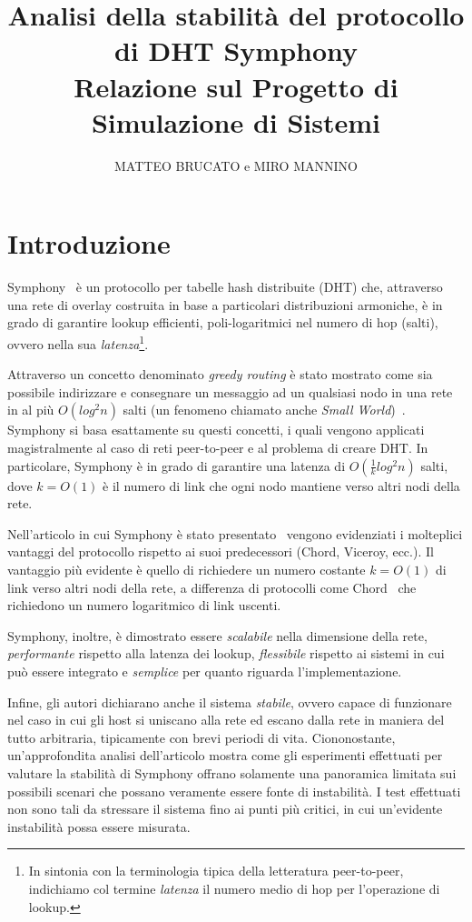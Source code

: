 \documentclass[prodmode,acmtap]{acmlarge}
\title{Analisi della stabilità del protocollo di DHT Symphony\\
\Large{Relazione sul Progetto di Simulazione di Sistemi}
}
\author{MATTEO BRUCATO e MIRO MANNINO\affil{Università di Bologna}
}
\begin{document}
\maketitle


\section{Introduzione}

Symphony~\cite{symphony} è un protocollo per tabelle hash distribuite (DHT) che, attraverso una rete di overlay costruita in base a particolari distribuzioni armoniche, è in grado di garantire lookup efficienti, poli-logaritmici nel numero di hop (salti), ovvero nella sua \emph{latenza}\footnote{In sintonia con la terminologia tipica della letteratura peer-to-peer, indichiamo col termine \emph{latenza} il numero medio di hop per l'operazione di lookup.}.

Attraverso un concetto denominato \emph{greedy routing} è stato mostrato come sia possibile indirizzare e consegnare un messaggio ad un qualsiasi nodo in una rete in al più $O(log^2 n)$ salti (un fenomeno chiamato anche \emph{Small World})~\cite{small-world}. Symphony si basa esattamente su questi concetti, i quali vengono applicati magistralmente al caso di reti peer-to-peer e al problema di creare DHT. In particolare, Symphony è in grado di garantire una latenza di $O(\frac{1}{k} log^2 n)$ salti, dove $k=O(1)$ è il numero di link che ogni nodo mantiene verso altri nodi della rete.

Nell'articolo in cui Symphony è stato presentato~\cite{symphony} vengono evidenziati i molteplici vantaggi del protocollo rispetto ai suoi predecessori (Chord, Viceroy, ecc.). Il vantaggio più evidente è quello di richiedere un numero costante $k=O(1)$ di link verso altri nodi della rete, a differenza di protocolli come Chord~\cite{chord} che richiedono un numero logaritmico di link uscenti.

Symphony, inoltre, è dimostrato essere \emph{scalabile} nella dimensione della rete, \emph{performante} rispetto alla latenza dei lookup, \emph{flessibile} rispetto ai sistemi in cui può essere integrato e \emph{semplice} per quanto riguarda l'implementazione.

Infine, gli autori dichiarano anche il sistema \emph{stabile}, ovvero capace di funzionare nel caso in cui gli host si uniscano alla rete ed escano dalla rete in maniera del tutto arbitraria, tipicamente con brevi periodi di vita. Ciononostante, un'approfondita analisi dell'articolo mostra come gli esperimenti effettuati per valutare la stabilità di Symphony offrano solamente una panoramica limitata sui possibili scenari che possano veramente essere fonte di instabilità. I test effettuati non sono tali da stressare il sistema fino ai punti più critici, in cui un'evidente instabilità possa essere misurata.
\end{document}

